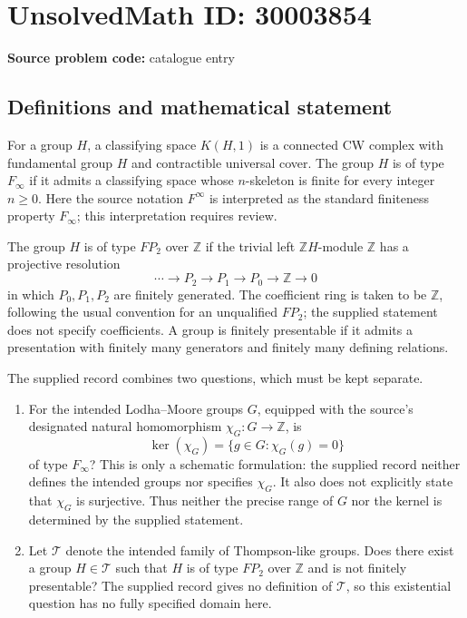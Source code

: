 \documentclass[11pt]{article}
\newcommand{\Z}{\mathbb{Z}}
\begin{document}
\section*{UnsolvedMath ID: 30003854}
\textbf{Source problem code:} catalogue entry
\subsection{Definitions and mathematical statement}
For a group \(H\), a classifying space \(K(H,1)\) is a connected CW complex with fundamental group \(H\) and contractible universal cover. The group \(H\) is of type \(F_\infty\) if it admits a classifying space whose \(n\)-skeleton is finite for every integer \(n\geq 0\). Here the source notation \(F^{\infty}\) is interpreted as the standard finiteness property \(F_\infty\); this interpretation requires review.

The group \(H\) is of type \(FP_2\) over \(\Z\) if the trivial left \(\Z H\)-module \(\Z\) has a projective resolution
\[
\cdots\longrightarrow P_2\longrightarrow P_1\longrightarrow P_0\longrightarrow\Z\longrightarrow 0
\]
in which \(P_0,P_1,P_2\) are finitely generated. The coefficient ring is taken to be \(\Z\), following the usual convention for an unqualified \(FP_2\); the supplied statement does not specify coefficients. A group is finitely presentable if it admits a presentation with finitely many generators and finitely many defining relations.

The supplied record combines two questions, which must be kept separate.
\begin{enumerate}
\item For the intended Lodha--Moore groups \(G\), equipped with the source's designated natural homomorphism \(\chi_G:G\to\Z\), is
\[
\ker(\chi_G)=\{g\in G:\chi_G(g)=0\}
\]
of type \(F_\infty\)? This is only a schematic formulation: the supplied record neither defines the intended groups nor specifies \(\chi_G\). It also does not explicitly state that \(\chi_G\) is surjective. Thus neither the precise range of \(G\) nor the kernel is determined by the supplied statement.
\item Let \(\mathcal T\) denote the intended family of Thompson-like groups. Does there exist a group \(H\in\mathcal T\) such that \(H\) is of type \(FP_2\) over \(\Z\) and is not finitely presentable? The supplied record gives no definition of \(\mathcal T\), so this existential question has no fully specified domain here.
\end{enumerate}
\end{document}
